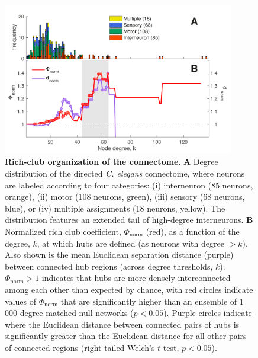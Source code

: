 \documentclass[10pt,letterpaper]{article}
\begin{document}


\begin{figure}[h]
   \centering
    \includegraphics[width=0.9\textwidth]{topologicalRCall2.pdf}
 \caption{\textbf{Rich-club organization of the connectome}.
\textbf{A} Degree distribution of the directed \textit{C. elegans} connectome, where neurons are labeled according to four categories:
(i) interneuron (85 neurons, orange),
(ii) motor (108 neurons, green),
(iii) sensory (68 neurons, blue), or
(iv) multiple assignments (18 neurons, yellow).
The distribution features an extended tail of high-degree interneurons.
\textbf{B}
Normalized rich club coefficient, $\Phi_\mathrm{norm}$ (red), as a function of the degree, $k$, at which hubs are defined (as neurons with degree $>k$).
Also shown is the mean Euclidean separation distance (purple) between connected hub regions (across degree thresholds, $k$).
$\Phi_\mathrm{norm} > 1$ indicates that hubs are more densely interconnected among each other than expected by chance, with red circles indicate values of $\Phi_\mathrm{norm}$ that are significantly higher than an ensemble of 1\,000 degree-matched null networks ($p < 0.05$).
Purple circles indicate where the Euclidean distance between connected pairs of hubs is significantly greater than the Euclidean distance for all other pairs of connected regions (right-tailed Welch's $t$-test, $p < 0.05$).
}
 \label{fig:topology_rich}
 \end{figure}
\end{document}
